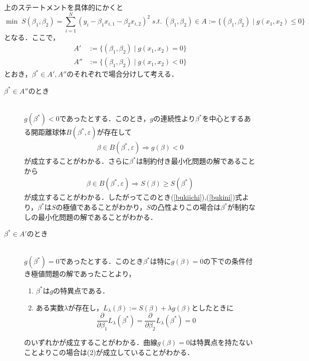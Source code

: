 \documentclass{jsarticle}
\theoremstyle{definition}
\theoremstyle{mystyle} %
\begin{document}
上のステートメントを具体的にかくと
$$\min\; S(\beta_1,\beta_2)=\sum_{i=1}^N (y_i-\beta_1 x_{i,1}-\beta_2 x_{i,2})^2\;s.t.\; (\beta_1,\beta_2)\in A:=\{(\beta_1,\beta_2)\mid g(x_1,x_2)\leq0\}$$
となる．ここで，
\begin{align*}
A'& :=\{(\beta_1,\beta_2)\mid g(x_1,x_2)=0\}\\
A''& :=\{(\beta_1,\beta_2)\mid g(x_1,x_2)<0\}
\end{align*}
とおき，$\beta^{\ast}\in A',A''$のそれぞれで場合分けして考える．\\
\begin{description}
\item[$\beta^{\ast}\in A''$のとき]\mbox{}\\
$g(\beta^{\ast})<0$であったとする．このとき，$g$の連続性より$\beta^{\ast}$を中心とするある開距離球体$B(\beta^{\ast},\varepsilon)$が存在して
\begin{align}
\label{bukiichi}
\beta\in B(\beta^{\ast},\varepsilon)\Rightarrow g(\beta)<0
\end{align}
が成立することがわかる．さらに$\beta^{\ast}$は制約付き最小化問題の解であることから
\begin{align}
\label{bukini}
\beta\in B(\beta^{\ast},\varepsilon)\Rightarrow S(\beta)\geq S(\beta^{\ast})
\end{align}
が成立することがわかる．したがってこのとき(\ref{bukiichi}),(\ref{bukini})式より，$\beta^{\ast}$は$S$の極値であることがわかり，$S$の凸性よりこの場合は$\beta^{\ast}$が制約なしの最小化問題の解であることがわかる．\\

\item[$\beta^{\ast}\in A'$のとき]\mbox{}\\
$g(\beta^{\ast})=0$であったとする．このとき$\beta^{\ast}$は特に$g(\beta)=0$の下での条件付き極値問題の解であったことより，
\begin{enumerate}[(1)]
\item $\beta^{\ast}$は$g$の特異点である．\\

\item ある実数$\lambda$が存在し，$L_{\lambda}(\beta):=S(\beta)+\lambda g(\beta)$としたときに
$$\frac{\partial }{\partial \beta_1}L_{\lambda}(\beta^{\ast})=\frac{\partial }{\partial \beta_2}L_{\lambda}(\beta^{\ast})=0$$
\end{enumerate}
のいずれかが成立することがわかる．曲線$g(\beta)=0$は特異点を持たないことよりこの場合は(2)が成立していることがわかる．\\


\end{description}
\end{document}
